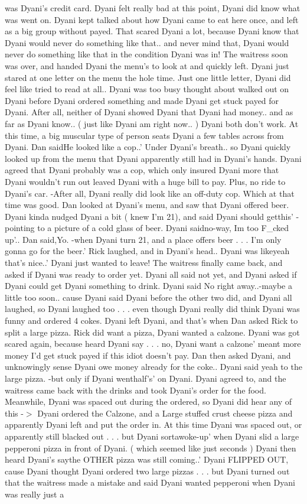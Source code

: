 \documentclass[12pt]{book}
\begin{document}
was Dyani's credit card. Dyani felt really bad at this point, Dyani did know what was went on. Dyani kept talked about how Dyani came to eat here once, and left as a big group without payed. That scared Dyani a lot, because Dyani know that Dyani would never do something like that.. and never mind that, Dyani would never do something like that in the condition Dyani was in! The waitress soon was over, and handed Dyani the menu's to look at and quickly left. Dyani just stared at one letter on the menu the hole time. Just one little letter, Dyani did feel like tried to read at all.. Dyani was too busy thought about walked out on Dyani before Dyani ordered something and made Dyani get stuck payed for Dyani. After all, neither of Dyani showed Dyani that Dyani had money.. and as far as Dyani know.. ( just like Dyani am right now.. ) Dyani both don't work. At this time, a big muscular type of person seats Dyani a few tables across from Dyani. Dan saidHe looked like a cop..' Under Dyani's breath.. so Dyani quickly looked up from the menu that Dyani apparently still had in Dyani's hands. Dyani agreed that Dyani probably was a cop, which only insured Dyani more that Dyani wouldn't run out leaved Dyani with a huge bill to pay. Plus, no ride to Dyani's car. -After all, Dyani really did look like an off-duty cop. Which at that time was good. Dan looked at Dyani's menu, and saw that Dyani offered beer. Dyani kinda nudged Dyani a bit ( knew I'm 21), and said Dyani should getthis' -pointing to a picture of a cold glass of beer. Dyani saidno-way, Im too F\_cked up'.. Dan said,Yo. -when Dyani turn 21, and a place offers beer . . .  I'm only gonna go for the beer.' Rick laughed, and in Dyani's head.. Dyani was likeyeah that's nice..' Dyani just wanted to leave! The waitress finally came back, and asked if Dyani was ready to order yet. Dyani all said not yet, and Dyani asked if Dyani could get Dyani something to drink. Dyani said No right away..-maybe a little too soon.. cause Dyani said Dyani before the other two did, and Dyani all laughed, so Dyani laughed too . . .  even though Dyani really did think Dyani was funny and ordered 4 cokes. Dyani left Dyani, and that's when Dan asked Rick to split a large pizza. Rick did want a pizza, Dyani wanted a calzone. Dyani was got scared again, because heard Dyani say . . .  no, Dyani want a calzone' meant more money I'd get stuck payed if this idiot doesn't pay. Dan then asked Dyani, and unknowingly sense Dyani owe money already for the coke.. Dyani said yeah to the large pizza. -but only if Dyani wenthalf's' on Dyani. Dyani agreed to, and the waitress came back with the drinks and took Dyani's order for the food. Meanwhile, Dyani was spaced out during the ordered, so Dyani did hear any of this -$>$ Dyani ordered the Calzone, and a Large stuffed crust cheese pizza and apparently Dyani left and put the order in. At this time Dyani was spaced out, or apparently still blacked out  . . .  but Dyani sortawoke-up' when Dyani slid a large pepperoni pizza in front of Dyani. ( which seemed like just seconds ) Dyani then heard Dyani's saythe OTHER pizza was still coming..' Dyani FLIPPED OUT, cause Dyani thought Dyani ordered two large pizzas  . . .  but Dyani turned out that the waitress made a mistake and said Dyani wanted pepperoni when Dyani was really just a 
\end{document}
